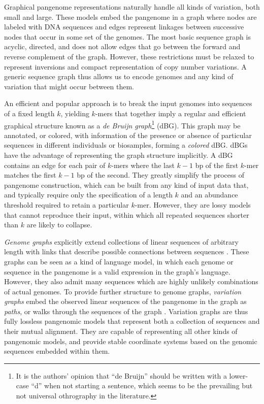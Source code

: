 Graphical pangenome representations naturally handle all kinds of variation, both small and large.
These models embed the pangenome in a graph where nodes are labeled with DNA sequences and edges represent linkages between successive nodes that occur in some set of the genomes.
The most basic sequence graph is acyclic, directed, and does not allow edges that go between the forward and reverse complement of the graph.
However, these restrictions must be relaxed to represent inversions and compact representation of copy number variations.
A generic sequence graph thus allows us to encode genomes and any kind of variation that might occur between them.

An efficient and popular approach is to break the input genomes into sequences of a fixed length $k$, yielding $k$-mers that together imply a regular and efficient graphical structure known as a \emph{de Bruijn graph}\footnote{It is the authors' opinion that ``de Bruijn'' should be written with a lower-case ``d'' when not starting a sentence, which seems to be the prevailing but not universal othrography in the literature.} (dBG).
This graph may be annotated, or colored, with information of the presence or absence of particular sequences in different individuals or biosamples, forming a \emph{colored} dBG.
dBGs have the advantage of representing the graph structure implicitly.
A dBG contains an edge for each pair of $k$-mers where the last $k-1$ bp of the first $k$-mer matches the first $k-1$ bp of the second.
They greatly simplify the process of pangenome construction, which can be built from any kind of input data that, and typically require only the specification of a length $k$ and an abundance threshold required to retain a particular $k$-mer.
However, they are lossy models that cannot reproduce their input, within which all repeated sequences shorter than $k$ are likely to collapse.

\emph{Genome graphs} explicitly extend collections of linear sequences of arbitrary length with links that describe possible connections between sequences \cite{Paten_2017}.
These graphs can be seen as a kind of language model, in which each genome or sequence in the pangenome is a valid expression in the graph's language.
However, they also admit many sequences which are highly unlikely combinations of actual genomes.
To provide further structure to genome graphs, \emph{variation graphs} embed the observed linear sequences of the pangenome in the graph as \emph{paths}, or walks through the sequences of the graph \cite{Garrison_2018}.
Variation graphs are thus fully lossless pangenomic models that represent both a collection of sequences and their mutual alignment.
They are capable of representing all other kinds of pangenomic models, and provide stable coordinate systems based on the genomic sequences embedded within them.

